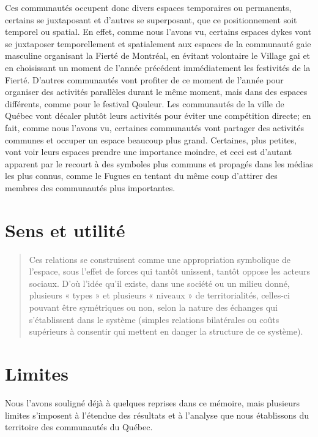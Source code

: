 Ces communautés occupent donc divers espaces temporaires ou permanents, certains se juxtaposant et d'autres se superposant, que ce positionnement soit temporel ou spatial.
En effet, comme nous l'avons vu, certains espaces dykes vont se juxtaposer temporellement et spatialement aux espaces de la communauté gaie masculine organisant la Fierté de Montréal, en évitant volontaire le Village gai et en choisissant un moment de l'année précédent immédiatement les festivités de la Fierté.
D'autres communautés vont profiter de ce moment de l'année pour organiser des activités parallèles durant le même moment, mais dans des espaces différents, comme pour le festival Qouleur.
Les communautés de la ville de Québec vont décaler plutôt leurs activités pour éviter une compétition directe; en fait, comme nous l'avons vu, certaines communautés vont partager des activités communes et occuper un espace beaucoup plus grand.
Certaines, plus petites, vont voir leurs espaces prendre une importance moindre, et ceci est d'autant apparent par le recourt à des symboles plus communs et propagés dans les médias les plus connus, comme le Fugues en tentant du même coup d'attirer des membres des communautés plus importantes.

\section*{Sens et utilité}
\label{sec:sens_et_utilit_}

\begin{quotation}
  Ces relations se construisent comme une appropriation symbolique de l'espace, sous l'effet de forces qui tantôt unissent, tantôt oppose les acteurs sociaux.
  D'où l'idée qu'il existe, dans une société ou un milieu donné, plusieurs « types » et plusieurs « niveaux » de territorialités, celles-ci pouvant être symétriques ou non, selon la nature des échanges qui s'établissent dans le système (simples relations bilatérales ou coûts supérieurs à consentir qui mettent en danger la structure de ce système).\citep[41]{Courville1991}
\end{quotation}

\section{Limites}
\label{sec:limites}

Nous l'avons souligné déjà à quelques reprises dans ce mémoire, mais plusieurs limites s'imposent à l'étendue des résultats et à l'analyse que nous établissons du territoire des communautés \lgbt{} du Québec.

